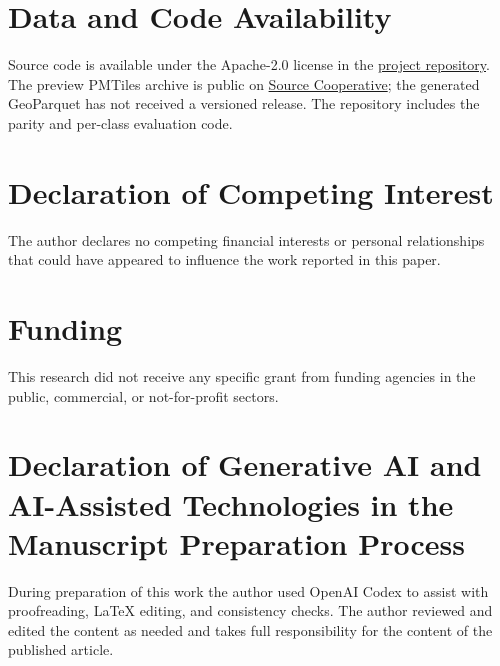 \documentclass[preprint,12pt]{elsarticle}
\begin{document}
\section*{Data and Code Availability}

Source code is available under the Apache-2.0 license in the
\href{https://github.com/isaaccorley/crop-sequence-boundaries-v2}{project
repository}. The preview PMTiles archive is public on
\href{https://source.coop/ftw/usda-csb}{Source Cooperative}; the generated
GeoParquet has not received a versioned release. The repository includes the
parity and per-class evaluation code.

\section*{Declaration of Competing Interest}

The author declares no competing financial interests or personal
relationships that could have appeared to influence the work reported in
this paper.

\section*{Funding}

This research did not receive any specific grant from funding agencies in
the public, commercial, or not-for-profit sectors.

\section*{Declaration of Generative AI and AI-Assisted Technologies in the Manuscript Preparation Process}

During preparation of this work the author used OpenAI Codex to assist
with proofreading, LaTeX editing, and consistency checks. The author
reviewed and edited the content as needed and takes full responsibility
for the content of the published article.



\end{document}
